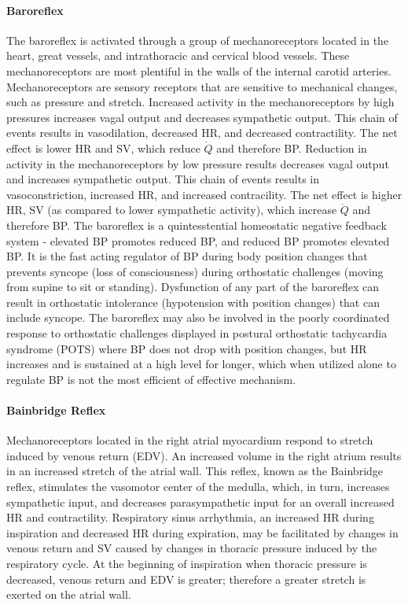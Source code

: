 \paragraph{Baroreflex}

The baroreflex is activated through a group of mechanoreceptors located in the heart, great vessels, and intrathoracic and cervical blood vessels. These mechanoreceptors are most plentiful in the walls of the internal carotid arteries. Mechanoreceptors are sensory receptors that are sensitive to mechanical changes, such as pressure and stretch. Increased activity in the mechanoreceptors by high pressures increases vagal output and decreases sympathetic output. This chain of events results in vasodilation, decreased HR, and decreased contractility. The net effect is lower HR and SV, which reduce $\dot{Q}$ and therefore BP. Reduction in activity in the mechanoreceptors by low pressure results decreases vagal output and increases sympathetic output. This chain of events results in vasoconstriction, increased HR, and increased contracility. The net effect is higher HR,  SV (as compared to lower sympathetic activity), which increase $\dot{Q}$ and therefore BP. The baroreflex is a quintesstential homeostatic negative feedback system - elevated BP promotes reduced BP, and reduced BP promotes elevated BP. It is the fast acting regulator of BP during body position changes that prevents syncope (loss of consciousness) during orthostatic challenges  (moving from supine to sit or standing).
Dysfunction of any part of the baroreflex can result in orthostatic intolerance (hypotension with position changes) that can include syncope. The baroreflex may also be involved in the poorly coordinated response to orthostatic challenges displayed in postural orthostatic tachycardia syndrome (POTS) where BP does not drop with position changes, but HR increases and is sustained at a high level for longer, which when utilized alone to regulate BP is not the most efficient of effective mechanism.  



\paragraph{Bainbridge Reflex}

Mechanoreceptors located in the right atrial myocardium respond to stretch induced by venous return (EDV). An increased volume in the right atrium results in an increased stretch of the atrial wall. This reflex, known as the Bainbridge reflex, stimulates the vasomotor center of the medulla, which, in turn, increases sympathetic input, and decreases parasympathetic input for an overall increased HR and contractility. Respiratory sinus arrhythmia, an increased HR during inspiration and decreased HR during expiration, may be facilitated by changes in venous return and SV caused by changes in thoracic pressure induced by the respiratory cycle. At the beginning of inspiration when thoracic pressure is decreased, venous return and EDV is greater; therefore a greater stretch is exerted on the atrial wall.

